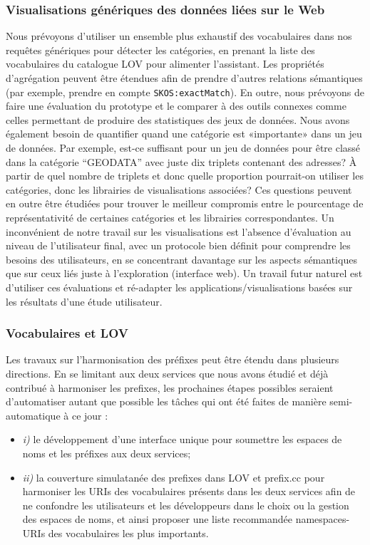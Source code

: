 \subsubsection*{Visualisations g\'{e}n\'{e}riques des donn\'{e}es li\'{e}es sur le Web}
Nous pr\'{e}voyons d'utiliser un ensemble plus exhaustif des vocabulaires dans nos requ\^{e}tes g\'{e}n\'{e}riques pour d\'{e}tecter les cat\'{e}gories, en prenant la liste des vocabulaires du catalogue LOV pour alimenter l'assistant. Les propri\'{e}t\'{e}s d'agr\'{e}gation peuvent \^{e}tre \'{e}tendues afin de prendre d'autres relations s\'{e}mantiques (par exemple, prendre en compte \texttt{SKOS:exactMatch}). En outre, nous pr\'{e}voyons de faire une \'{e}valuation du prototype et le comparer à des outils connexes comme celles permettant de produire des statistiques des jeux de donn\'{e}es. Nous avons \'{e}galement besoin de quantifier quand une cat\'{e}gorie est «importante» dans un jeu de donn\'{e}es. Par exemple, est-ce suffisant pour un jeu de donn\'{e}es pour \^{e}tre class\'{e} dans la cat\'{e}gorie ``GEODATA'' avec juste dix triplets contenant des adresses? À partir de quel nombre de triplets et donc quelle proportion pourrait-on utiliser les cat\'{e}gories, donc les librairies de visualisations associ\'{e}es? Ces questions peuvent en outre \^{e}tre \'{e}tudi\'{e}es pour trouver le meilleur compromis entre le pourcentage de repr\'{e}sentativit\'{e} de certaines cat\'{e}gories et les librairies correspondantes. Un  inconv\'{e}nient de notre travail sur les visualisations est l'absence d'\'{e}valuation au niveau de l'utilisateur final, avec un protocole bien d\'{e}finit pour comprendre les besoins des utilisateurs, en se concentrant davantage sur les aspects s\'{e}mantiques que sur ceux li\'{e}s juste à l'exploration (interface web). Un travail futur naturel est d'utiliser ces \'{e}valuations et r\'{e}-adapter les applications/visualisations bas\'{e}es sur les r\'{e}sultats d'une \'{e}tude utilisateur.

\subsubsection*{Vocabulaires et LOV}
\label{sec:nextSteps}
Les travaux sur l'harmonisation des pr\'{e}fixes peut \^{e}tre \'{e}tendu dans plusieurs directions. En se limitant aux deux services que nous avons \'{e}tudi\'{e} et d\'{e}jà contribu\'{e} à harmoniser les prefixes, les prochaines \'{e}tapes possibles seraient d'automatiser autant que possible les tâches qui ont \'{e}t\'{e} faites de mani\`{e}re semi-automatique à ce jour :
\begin{itemize}
 \item \emph{i)} le d\'{e}veloppement d'une interface unique pour soumettre les espaces de noms et les pr\'{e}fixes aux deux services;
 \item \emph{ii)} la couverture simulatan\'{e}e des prefixes dans LOV et prefix.cc pour harmoniser les URIs des vocabulaires pr\'{e}sents dans les deux services afin de ne confondre les utilisateurs et les d\'{e}veloppeurs dans le choix ou la gestion des espaces de noms, et ainsi proposer une liste recommand\'{e}e namespaces-URIs des vocabulaires les plus importants.
\end{itemize}

